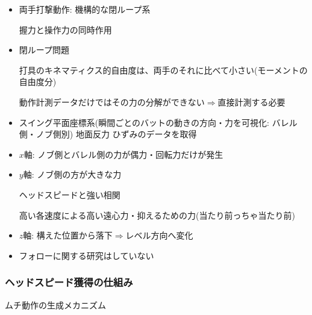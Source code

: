 \documentclass[dvipdfmx, 10.5pt]{jsarticle}
\begin{document}
\begin{itemize}
  \item 両手打撃動作: 機構的な閉ループ系

  握力と操作力の同時作用

  \item 閉ループ問題

  打具のキネマティクス的自由度は、両手のそれに比べて小さい(モーメントの自由度分)

  動作計測データだけではその力の分解ができない$\Rightarrow$直接計測する必要

  \item スイング平面座標系(瞬間ごとのバットの動きの方向・力を可視化: バレル側・ノブ側別) 地面反力 ひずみのデータを取得

  \item $x$軸: ノブ側とバレル側の力が偶力・回転力だけが発生

  \item $y$軸: ノブ側の方が大きな力

  ヘッドスピードと強い相関

  高い各速度による高い遠心力・抑えるための力(当たり前っちゃ当たり前)

  \item $z$軸: 構えた位置から落下$\Rightarrow$レベル方向へ変化

  \item フォローに関する研究はしていない

\end{itemize}

\subsubsection{ヘッドスピード獲得の仕組み}

ムチ動作の生成メカニズム
\end{document}
